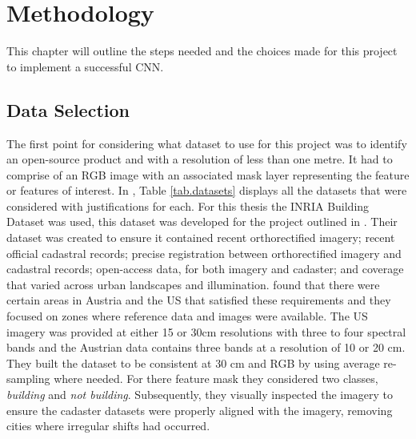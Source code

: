 \chapter{Methodology}
This chapter will outline the steps needed and the choices made for this project to implement a successful CNN.
\section{Data Selection}
The first point for considering what dataset to use for this project was to identify an open-source product and with a resolution of less than one metre. It had to comprise of an RGB image with an associated mask layer representing the feature or features of interest. In \cite{Richmond19b}, Table \ref{tab.datasets} displays all the datasets that were considered with justifications for each. For this thesis the INRIA Building Dataset was used, this dataset was developed for the project outlined in \cite{maggiori17a}. Their dataset was created to ensure it contained recent orthorectified imagery; recent official cadastral records; precise registration between orthorectified imagery and cadastral records; open-access data, for both imagery and cadaster; and coverage that varied across urban landscapes and illumination. \cite{maggiori17a} found that there were certain areas in Austria and the US that satisfied these requirements and they focused on zones where reference data and images were available. The US imagery was provided at either 15 or 30cm resolutions with three to four spectral bands and the Austrian data contains three bands at a resolution of 10 or 20 cm. They built the dataset to be consistent at 30 cm and RGB by using average re-sampling where needed. For there feature mask they considered two classes, \textit{building} and \textit{not building}. Subsequently, they visually inspected the imagery to ensure the cadaster datasets were properly aligned with the imagery, removing cities where irregular shifts had occurred. 

